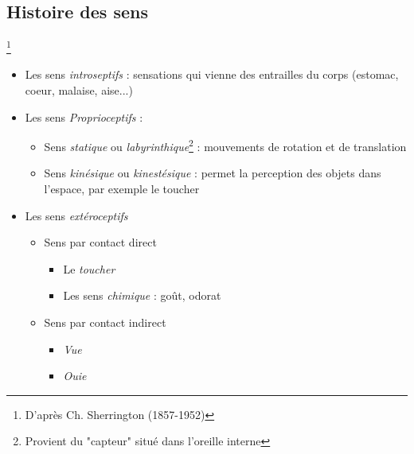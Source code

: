 \subsection{Histoire des sens} \footnote{D'après Ch. Sherrington (1857-1952)}
\begin{itemize}
    \item Les sens \textit{introseptifs} : sensations qui vienne des entrailles du corps (estomac, coeur, malaise, aise...)
    \item Les sens \textit{Proprioceptifs} : 
        \begin{itemize}
            \item Sens \textit{statique} ou \textit{labyrinthique}\footnote{Provient du "capteur" situé dans l'oreille interne} : mouvements de rotation et de translation
            \item Sens \textit{kinésique} ou \textit{kinestésique} : permet la perception des objets dans l'espace, par exemple le toucher
        \end{itemize}
    \item Les sens \textit{extéroceptifs}
        \begin{itemize}
            \item Sens par contact direct
                \begin{itemize}
                    \item Le \textit{toucher}
                    \item Les sens \textit{chimique} : goût, odorat
                \end{itemize}
            \item Sens par contact indirect
                \begin{itemize}
                    \item \textit{Vue}
                    \item \textit{Ouie}
                \end{itemize}
        \end{itemize}
\end{itemize}
\newpage
